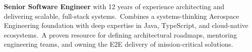 \thispagestyle{empty} %

{\fontsize{26pt}{30pt}\selectfont\bfseries\RaggedRight{}\par}
\vspace{\spacingAfterHeaderName}
{\small\noindent
\href{\resumeLocationUrl}{\textcolor{colorHeadings}{}\thinspace\resumeLocation}\contactSeparator
\href{tel:\resumePhone}{\textcolor{colorHeadings}{}\thinspace\resumePhone}\contactSeparator
\href{mailto:\resumeEmail}{\textcolor{colorHeadings}{}\thinspace\resumeEmail}\contactSeparator
\href{https://\resumeLinkedIn}{\textcolor{colorHeadings}{}\thinspace\resumeLinkedIn}
\par}
\vspace{\spacingAfterHeaderContact}

\noindent \textbf{Senior Software Engineer} with 12 years of experience architecting and delivering scalable, full-stack systems.\ Combines a systems-thinking Aerospace Engineering foundation with deep expertise in Java, TypeScript, and cloud-native ecosystems.\ A proven resource for defining architectural roadmaps, mentoring engineering teams, and owning the E2E delivery of mission-critical solutions.
\vspace{\spacingAfterHeaderContact}



